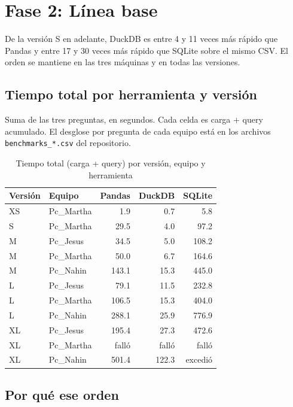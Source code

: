 \section{Fase 2: Línea base}

De la versión S en adelante, DuckDB es entre 4 y 11 veces más rápido que Pandas y entre 17 y 30 veces más rápido que SQLite sobre el mismo CSV. El orden se mantiene en las tres máquinas y en todas las versiones.

\subsection{Tiempo total por herramienta y versión}

Suma de las tres preguntas, en segundos. Cada celda es carga $+$ query acumulado. El desglose por pregunta de cada equipo está en los archivos \texttt{benchmarks\_*.csv} del repositorio.

\begin{table}[htbp]
\centering
\small
\caption{Tiempo total (carga + query) por versión, equipo y herramienta}
\label{tab:fase2-tiempos}
\begin{tabular}{llrrr}
\toprule
Versión & Equipo & Pandas & DuckDB & SQLite \\
\midrule
XS & Pc\_Martha & 1.9   & 0.7   & 5.8 \\
S  & Pc\_Martha & 29.5  & 4.0   & 97.2 \\
M  & Pc\_Jesus  & 34.5  & 5.0   & 108.2 \\
M  & Pc\_Martha & 50.0  & 6.7   & 164.6 \\
M  & Pc\_Nahin  & 143.1 & 15.3  & 445.0 \\
L  & Pc\_Jesus  & 79.1  & 11.5  & 232.8 \\
L  & Pc\_Martha & 106.5 & 15.3  & 404.0 \\
L  & Pc\_Nahin  & 288.1 & 25.9  & 776.9 \\
XL & Pc\_Jesus  & 195.4 & 27.3  & 472.6 \\
XL & Pc\_Martha & falló & falló & falló \\
XL & Pc\_Nahin  & 501.4 & 122.3 & excedió \\
\bottomrule
\end{tabular}
\end{table}

\subsection{Por qué ese orden}

